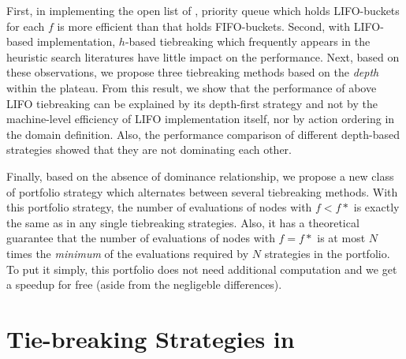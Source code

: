 % 
First, in implementing the open list of \astar, priority queue which holds
LIFO-buckets for each $f$ is more efficient than that holds FIFO-buckets.
% 
Second, with LIFO-based implementation, $h$-based tiebreaking which
frequently appears in the heuristic search literatures have little
impact on the performance.
% 
% 
Next, based on these observations, we propose three tiebreaking methods
based on the \emph{depth} within the plateau.  From this result, we show
that the performance of above LIFO tiebreaking can be explained by its
depth-first strategy and not by the machine-level efficiency of LIFO
implementation itself, nor by action ordering in the domain definition.
Also, the performance comparison of different
depth-based strategies showed that they are not dominating each other.

Finally, based on the absence of dominance relationship, we propose a
new class of portfolio strategy which alternates between several
tiebreaking methods.
% 
With this portfolio strategy,
the number of evaluations of nodes with $f<f*$ is exactly the same as
in any single tiebreaking strategies.
Also, it has a theoretical guarantee that
the number of evaluations of nodes with $f=f*$ is at most $N$ times the \emph{minimum} 
of the evaluations required by $N$ strategies in the portfolio.
To put it simply, this portfolio does not need additional computation
and we get a speedup for free (aside from the negligeble differences).




\section{Tie-breaking Strategies in \astar}


